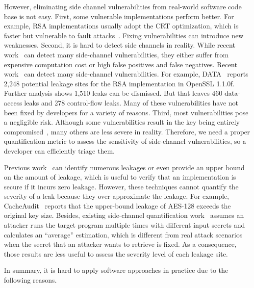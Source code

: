 However, eliminating side channel vulnerabilities from real-world software code base is not easy. First, some vulnerable implementations perform better. For example, RSA implementations usually adopt the CRT optimization,
which is faster but vulnerable to fault attacks~\cite{aumuller2002fault}. Fixing vulnerabilities can introduce new
weaknesses. Second, it is hard to detect side channels in reality. While recent work~\cite{203878,217537,Wichelmann:2018:MFF:3274694.3274741,Brotzman19Casym,236338,182946} can detect many side-channel vulnerabilities, they either suffer from expensive computation cost or high false positives and false negatives. Recent work~\cite{203878,217537,Wichelmann:2018:MFF:3274694.3274741,Brotzman19Casym,236338,182946} can detect many side-channel vulnerabilities. For example, DATA~\cite{217537} reports 2,248 potential leakage sites for the RSA implementation in OpenSSL 1.1.0f\@. Further analysis shows 1,510 leaks can be dismissed. But that leaves 460 data-access leaks and 278 control-flow leaks. Many of these vulnerabilities have not been fixed by developers for a variety of reasons. Third, most vulnerabilities pose a negligible risk.
Although some vulnerabilities result in the key being
entirely compromised~\cite{184415, aumuller2002fault},
many others are less severe in reality. Therefore, we need a proper quantification metric to assess the sensitivity of side-channel vulnerabilities, so a developer can efficiently triage them.

Previous work~\cite{182946,5207642} can identify numerous leakages or even provide an upper bound on the amount of leakage, which is useful to verify that an implementation is secure if it incurs zero leakage.
However, these techniques cannot quantify the severity of a leak because they over approximate the leakage. For example, CacheAudit~\cite{182946}
reports that the upper-bound leakage of AES-128 exceeds the original key size. Besides, existing side-channel quantification work~\cite{182946,5207642} assumes an attacker runs the target program multiple times with different
input secrets and calculates an ``average'' estimation, which is different from real attack scenarios when the secret that an attacker wants to retrieve is fixed. As a consequence, those results are less useful to assess the severity level of each leakage site.


In summary, it is hard to apply software approaches in practice due to the following reasons.

